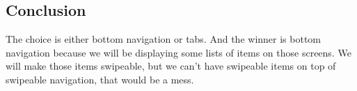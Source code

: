 %
%

\subsection{Conclusion}
The choice is either bottom navigation or tabs.
And the winner is bottom navigation because we will be displaying some lists of items on those screens. We will make those items swipeable, but we can't have swipeable items on top of swipeable navigation, that would be a mess.


